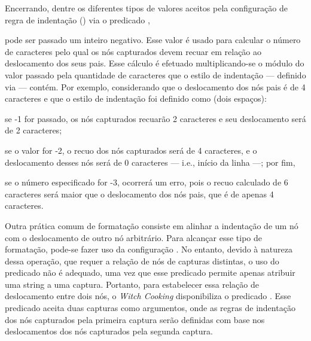 \documentclass
  [11pt,a4paper,english,brazil,openright,sumario=tradicional,twoside]
  {abntex2}
\newcommand{\witchcooking}{\textit{Witch Cooking}\xspace}
\begin{document}
\begin{inparaenum}
          Encerrando, dentre os diferentes tipos de valores aceitos pela
          configuração de regra de indentação ()
          via o predicado ,
    \item pode ser passado um inteiro negativo. Esse valor é usado para
          calcular o número de caracteres pelo qual os nós capturados devem
          recuar em relação ao deslocamento dos seus pais. Esse cálculo é
          efetuado multiplicando-se o módulo do valor passado pela quantidade
          de caracteres que o estilo de indentação --- definido via
           --- contém. Por exemplo,
          considerando que o deslocamento dos nós pais é de 4 caracteres e que
          o estilo de indentação foi definido como 
          (dois espaços):
          \begin{inparaenum}
            \item se -1 for passado, os nós capturados recuarão 2 caracteres e
                  seu deslocamento será de 2 caracteres;
            \item se o valor for -2, o recuo dos nós capturados será de 4
                  caracteres, e o deslocamento desses nós será de 0 caracteres
                  --- i.e., início da linha ---; por fim,
            \item se o número especificado for -3, ocorrerá um erro, pois o
                  recuo calculado de 6 caracteres será maior que o deslocamento
                  dos nós pais, que é de apenas 4 caracteres.
          \end{inparaenum}
  \end{inparaenum}

  Outra prática comum de formatação consiste em alinhar a indentação de um nó
  com o deslocamento de outro nó arbitrário. Para alcançar esse tipo de
  formatação, pode-se fazer uso da configuração
  . No entanto, devido à natureza dessa
  operação, que requer a relação de nós de capturas distintas, o uso do
  predicado  não é adequado, uma vez que esse predicado
  permite apenas atribuir uma string a uma captura. Portanto, para estabelecer
  essa relação de deslocamento entre dois nós, o \witchcooking disponibiliza o
  predicado . Esse predicado aceita duas
  capturas como argumentos, onde as regras de indentação dos nós capturados
  pela primeira captura serão definidas com base nos deslocamentos dos nós
  capturados pela segunda captura.
\end{document}
